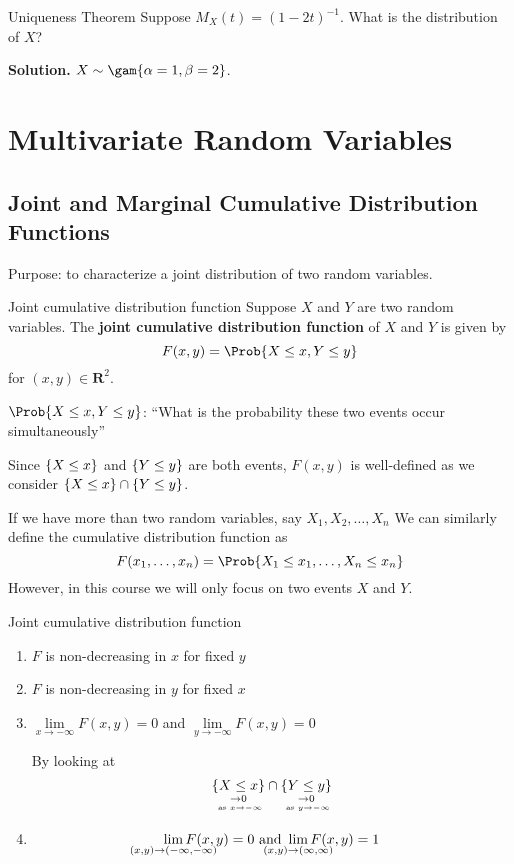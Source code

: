 \begin{Example}{Uniqueness Theorem}{}
    Suppose $ M_X(t)=(1-2t)^{-1} $. What is the
    distribution of $ X $?

    \textbf{Solution.} $ X \sim \gam{\alpha=1,\beta=2}$.
\end{Example}

\chapter{Multivariate Random Variables}
\section{Joint and Marginal Cumulative Distribution Functions}
Purpose: to characterize a joint distribution
of two random variables.
\begin{Definition}{Joint cumulative distribution function}{}
    Suppose $ X $ and $ Y $ are two random variables.
    The \textbf{joint cumulative
        distribution function} of $ X $ and $ Y $ is given by
    \[ F(x,y)=\Prob{X\le x,Y\le y} \]
    for $ (x,y)\in\mathbf{R}^2 $.
\end{Definition}
$ \Prob{X\le x,Y\le y} $:
``What is the probability these two events occur simultaneously''
\begin{Remark}{}{}
    Since $ \{X\le x\} $ and $ \{Y\le y\} $
    are both events, $ F(x,y) $ is well-defined as
    we consider $ \{X\le x\}\cap \{Y\le y\} $.
\end{Remark}
\begin{Remark}{}{}
    If we have more than two random variables, say $ X_1,X_2,\ldots,X_n $
    We can similarly define the cumulative distribution function as
    \[ F(x_1,\ldots,x_n)=\Prob{X_1\le x_1,\ldots,X_n\le x_n} \]
    However, in this course we will only focus on two events $ X $ and $ Y $.
\end{Remark}

\begin{Definition}{Joint cumulative distribution function}{}
    \begin{enumerate}[label=(\Roman*)]
        \item $ F $ is non-decreasing in $ x $ for fixed $ y $
        \item $ F $ is non-decreasing in $ y $ for fixed $ x $
        \item $ \displaystyle \lim\limits_{{x} \to {-\infty}} F(x,y)=0 $
              and $ \displaystyle \lim\limits_{{y} \to {-\infty}} F(x,y)=0 $

              By looking at
              \[ \underset{\underset{\text{ as }x\to-\infty}{\to 0}}{\{X\le x\}}\cap
                  \underset{\underset{\text{ as }y\to-\infty}{\to 0}}{\{Y\le y\}} \]
        \item \[ \displaystyle
                  \smashoperator{\lim\limits_{{(x,y)} \to {(-\infty,-\infty)}}}
                  F(x,y)=0\text{ and }
                  \displaystyle
                  \smashoperator{\lim\limits_{{(x,y)} \to {(\infty,\infty)}}}
                  F(x,y)=1 \]
    \end{enumerate}
\end{Definition}

